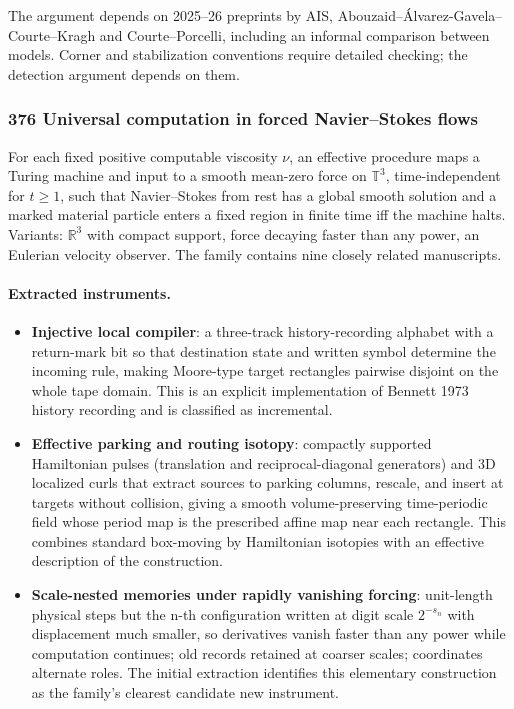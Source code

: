 \documentclass[11pt]{article}
\newcommand{\badges}[1]{\par\noindent{\small\sffamily\color{black!70}#1}\par\smallskip}
\newcommand{\badgesep}{\textbar}
\begin{document}
The argument depends on 2025--26 preprints by AIS, Abouzaid--Álvarez-Gavela--Courte--Kragh and Courte--Porcelli, including an informal comparison between models. Corner and stabilization conventions require detailed checking; the detection argument depends on them.

\subsubsection{\texorpdfstring{376 \textperiodcentered{} Universal computation in forced Navier--Stokes flows}{376 · Universal computation in forced Navier–Stokes flows}}\label{fam:376}
\badges{lemmas formalized; main paper not \badgesep{} incremental}

For each fixed positive computable viscosity $\nu$, an effective procedure maps a Turing machine and input to a smooth mean-zero force on $\mathbb{T}^{3}$, time-independent for $t \ge 1$, such that Navier--Stokes from rest has a global smooth solution and a marked material particle enters a fixed region in finite time iff the machine halts. Variants: $\mathbb{R}^{3}$ with compact support, force decaying faster than any power, an Eulerian velocity observer. The family contains nine closely related manuscripts.

\paragraph{Extracted instruments.}

\begin{itemize}
\item \textbf{Injective local compiler}: a three-track history-recording alphabet with a return-mark bit so that destination state and written symbol determine the incoming rule, making Moore-type target rectangles pairwise disjoint on the whole tape domain. This is an explicit implementation of Bennett 1973 history recording and is classified as incremental.
\item \textbf{Effective parking and routing isotopy}: compactly supported Hamiltonian pulses (translation and reciprocal-diagonal generators) and 3D localized curls that extract sources to parking columns, rescale, and insert at targets without collision, giving a smooth volume-preserving time-periodic field whose period map is the prescribed affine map near each rectangle. This combines standard box-moving by Hamiltonian isotopies with an effective description of the construction.
\item \textbf{Scale-nested memories under rapidly vanishing forcing}: unit-length physical steps but the n-th configuration written at digit scale $2^{-s_n}$ with displacement much smaller, so derivatives vanish faster than any power while computation continues; old records retained at coarser scales; coordinates alternate roles. The initial extraction identifies this elementary construction as the family's clearest candidate new instrument.
\end{itemize}
\end{document}
